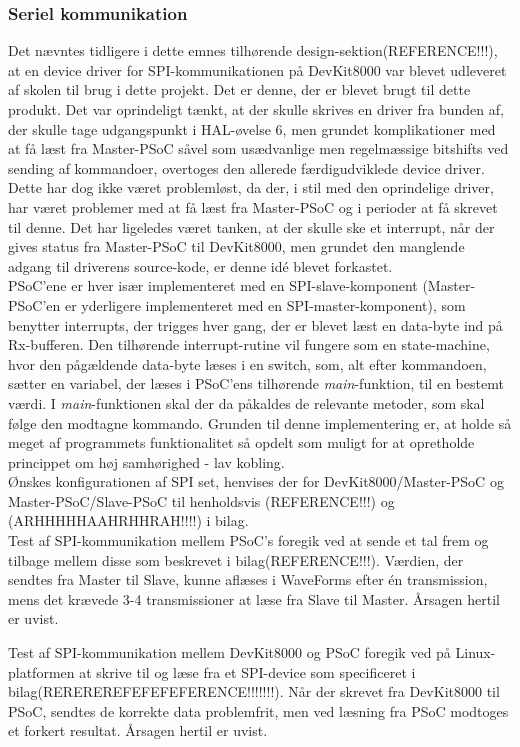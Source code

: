 \subsubsection{Seriel kommunikation}

Det nævntes tidligere i dette emnes tilhørende design-sektion(REFERENCE!!!), at en device driver for SPI-kommunikationen på DevKit8000 var blevet udleveret af skolen til brug i dette projekt. Det er denne, der er blevet brugt til dette produkt. Det var oprindeligt tænkt, at der skulle skrives en driver fra bunden af, der skulle tage udgangspunkt i HAL-øvelse 6, men grundet komplikationer med at få læst fra Master-PSoC såvel som usædvanlige men regelmæssige bitshifts ved sending af kommandoer, overtoges den allerede færdigudviklede device driver. Dette har dog ikke været problemløst, da der, i stil med den oprindelige driver, har været problemer med at få læst fra Master-PSoC og i perioder at få skrevet til denne. Det har ligeledes været tanken, at der skulle ske et interrupt, når der gives status fra Master-PSoC til DevKit8000, men grundet den manglende adgang til driverens source-kode, er denne idé blevet forkastet. \\

PSoC'ene er hver især implementeret med en SPI-slave-komponent (Master-PSoC'en er yderligere implementeret med en SPI-master-komponent), som benytter interrupts, der trigges hver gang, der er blevet læst en data-byte ind på Rx-bufferen. Den tilhørende interrupt-rutine vil fungere som en state-machine, hvor den pågældende data-byte læses i en switch, som, alt efter kommandoen, sætter en variabel, der læses i PSoC'ens tilhørende \textit{main}-funktion, til en bestemt værdi. I \textit{main}-funktionen skal der da påkaldes de relevante metoder, som skal følge den modtagne kommando. Grunden til denne implementering er, at holde så meget af programmets funktionalitet så opdelt som muligt for at opretholde princippet om høj samhørighed - lav kobling. \\

Ønskes konfigurationen af SPI set, henvises der for DevKit8000/Master-PSoC og Master-PSoC/Slave-PSoC til henholdsvis (REFERENCE!!!) og (ARHHHHHAAHRHHRAH!!!!) i bilag. \\

Test af SPI-kommunikation mellem PSoC's foregik ved at sende et tal frem og tilbage mellem disse som beskrevet i bilag(REFERENCE!!!). Værdien, der sendtes fra Master til Slave, kunne aflæses i WaveForms efter én transmission, mens det krævede 3-4 transmissioner at læse fra Slave til Master. Årsagen hertil er uvist.

Test af SPI-kommunikation mellem DevKit8000 og PSoC foregik ved på Linux-platformen at skrive til og læse fra et SPI-device som specificeret i bilag(REREREREFEFEFEFERENCE!!!!!!!). Når der skrevet fra DevKit8000 til PSoC, sendtes de korrekte data problemfrit, men ved læsning fra PSoC modtoges et forkert resultat. Årsagen hertil er uvist.